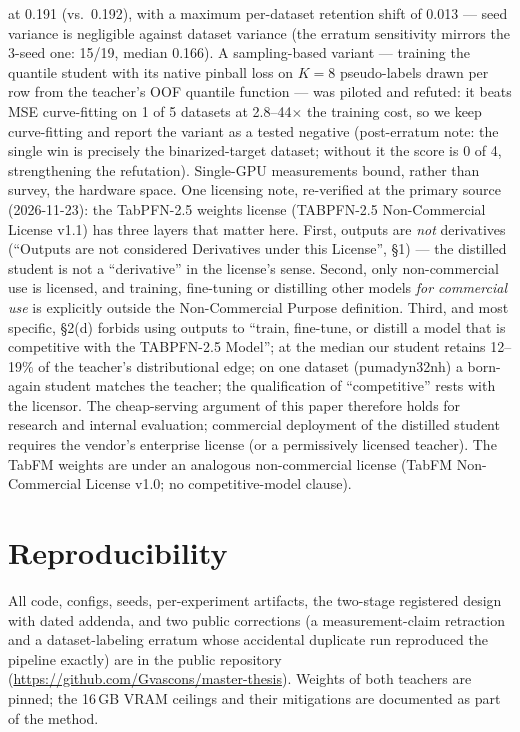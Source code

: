 \documentclass[11pt]{article}
\begin{document}
at 0.191 (vs.\ 0.192), with a maximum per-dataset retention shift of
0.013 --- seed variance is negligible against dataset variance (the
erratum sensitivity mirrors the 3-seed one: 15/19, median 0.166). A sampling-based variant --- training the
quantile student with its native pinball loss on $K{=}8$ pseudo-labels
drawn per row from the teacher's OOF quantile function --- was piloted
and refuted: it beats MSE curve-fitting on 1 of 5 datasets at
2.8--44$\times$ the training cost, so we keep curve-fitting and report
the variant as a tested negative (post-erratum note: the single win is
precisely the binarized-target dataset; without it the score is 0 of
4, strengthening the refutation).
Single-GPU measurements bound, rather than
survey, the hardware space. One licensing note, re-verified at the
primary source (2026-11-23): the TabPFN-2.5 weights license (TABPFN-2.5
Non-Commercial License v1.1) has three layers that matter here. First,
outputs are \emph{not} derivatives (``Outputs are not considered
Derivatives under this License'', §1) --- the distilled student is not
a ``derivative'' in the license's sense. Second, only non-commercial
use is licensed, and training, fine-tuning or distilling other models
\emph{for commercial use} is explicitly outside the Non-Commercial
Purpose definition. Third, and most specific, §2(d) forbids using
outputs to ``train, fine-tune, or distill a model that is competitive
with the TABPFN-2.5 Model''; at the median our student retains
12--19\% of the
teacher's distributional edge; on one dataset (pumadyn32nh) a
born-again student matches the teacher; the qualification of
``competitive'' rests with the licensor. The cheap-serving
argument of this paper therefore holds for research and internal
evaluation; commercial deployment of the distilled student requires
the vendor's enterprise license (or a permissively licensed teacher).
The TabFM weights are under an analogous non-commercial license
(TabFM Non-Commercial License v1.0; no competitive-model clause).

\section{Reproducibility}

All code, configs, seeds, per-experiment artifacts, the two-stage
registered design with dated addenda, and two public corrections (a measurement-claim
retraction and a dataset-labeling erratum whose accidental duplicate run
reproduced the pipeline exactly) are in the public repository
(\url{https://github.com/Gvascons/master-thesis}). Weights of both teachers
are pinned; the 16\,GB VRAM ceilings and their mitigations are documented
as part of the method.
\end{document}
